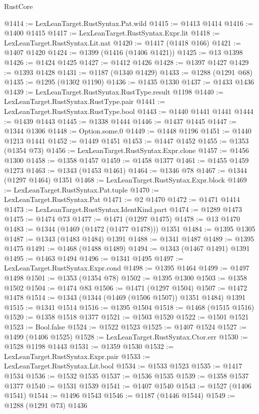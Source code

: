 \begin{lexlean}{RustCore}
\begin{coremodule}
{\begin{coremodule}
{{{{{{{{{{{{{{{{{{{{{{{{{{{{{{{{{{{{{{{{{{{{@1414 := LexLeanTarget.RustSyntax.Pat.wild
@1415 := @1413 @1414
@1416 := @1400 @1415
@1417 := LexLeanTarget.RustSyntax.Expr.lit
@1418 := LexLeanTarget.RustSyntax.Lit.nat
@1420 := @1417 (@1418 @166)
@1421 := @1407 @1420
@1424 := @1399 (@1416 (@1406 @1421))
@1425 := @13 @1398
@1426 := @1424 @1425
@1427 := @1412 @1426
@1428 := @1397 @1427
@1429 := @1393 @1428
@1431 := @1187 (@1340 @1429)
@1433 := @1288 (@1291 @68)
@1435 := @1295 (@1302 @1190)
@1436 := @1435 @1330
@1437 := @1433 @1436
@1439 := LexLeanTarget.RustSyntax.RustType.result @1198
@1440 := LexLeanTarget.RustSyntax.RustType.pair
@1441 := LexLeanTarget.RustSyntax.RustType.bool
@1443 := @1440 @1441 @1441
@1444 := @1439 @1443
@1445 := @1338 @1444
@1446 := @1437 @1445
@1447 := @1344 @1306
@1448 := Option.some.{0}
@1449 := @1448 @1196
@1451 := @1440 @1213 @1441
@1452 := @1449 @1451
@1453 := @1447 @1452
@1455 := @1353 (@1354 @73)
@1456 := LexLeanTarget.RustSyntax.Expr.clone
@1457 := @1456 @1300
@1458 := @1358 @1457
@1459 := @1458 @1377
@1461 := @1455 @1459 @1273
@1463 := @1343 (@1453 @1461)
@1464 := @1346 @78
@1467 := @1344 (@1297 @1464) @1351
@1468 := LexLeanTarget.RustSyntax.Expr.block
@1469 := LexLeanTarget.RustSyntax.Pat.tuple
@1470 := LexLeanTarget.RustSyntax.Pat
@1471 := @2 @1470
@1472 := @1471 @1414
@1473 := LexLeanTarget.RustSyntax.IdentKind.part
@1474 := @1289 @1473
@1475 := @1474 @73
@1477 := @1471 (@1297 @1475)
@1478 := @13 @1470
@1483 := @1344 (@1469 (@1472 (@1477 @1478))) @1351
@1484 := @1395 @1305
@1487 := @1343 (@1483 @1484) @1391
@1488 := @1341 @1487
@1489 := @1395 @1475
@1491 := @1468 (@1488 @1489)
@1494 := @1343 (@1467 @1491) @1391
@1495 := @1463 @1494
@1496 := @1341 @1495
@1497 := LexLeanTarget.RustSyntax.Expr.cond
@1498 := @1395 @1464
@1499 := @1497 @1498
@1501 := @1353 (@1354 @78)
@1502 := @1395 @1300
@1503 := @1358 @1502
@1504 := @1474 @83
@1506 := @1471 (@1297 @1504)
@1507 := @1472 @1478
@1514 := @1343 (@1344 (@1469 (@1506 @1507)) @1351 @1484) @1391
@1515 := @1341 @1514
@1516 := @1395 @1504
@1518 := @1468 (@1515 @1516)
@1520 := @1358 @1518 @1377
@1521 := @1503 @1520
@1522 := @1501 @1521
@1523 := Bool.false
@1524 := @1522 @1523
@1525 := @1407 @1524
@1527 := @1499 (@1406 @1525)
@1528 := LexLeanTarget.RustSyntax.Ctor.err
@1530 := @1528 @1198 @1443
@1531 := @1359 @1530
@1532 := LexLeanTarget.RustSyntax.Expr.pair
@1533 := LexLeanTarget.RustSyntax.Lit.bool
@1534 := @1533 @1523
@1535 := @1417 @1534
@1536 := @1532 @1535
@1537 := @1536 @1535
@1539 := @1358 @1537 @1377
@1540 := @1531 @1539
@1541 := @1407 @1540
@1543 := @1527 (@1406 @1541)
@1544 := @1496 @1543
@1546 := @1187 (@1446 @1544)
@1549 := @1288 (@1291 @73) @1436
}}}}}}}}}}}}}}}}}}}}}}}}}}}}}}}}}}}}}}}}}}}}
\end{coremodule}}
\end{coremodule}
\end{lexlean}
